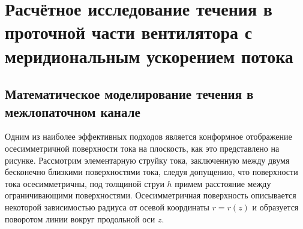 \chapter{Расчётное исследование течения в проточной части вентилятора с меридиональным ускорением потока}

\section{Математическое моделирование течения в межлопаточном канале }

Одним из наиболее эффективных подходов является конформное отображение осесимметричной поверхности тока на плоскость, как это представлено на рисунке.
Рассмотрим элементарную струйку тока, заключенную между двумя бесконечно близкими поверхностями тока, следуя допущению, что поверхности тока осесимметричны, под толщиной струи \(h\) примем расстояние между ограничивающими поверхностями. Осесимметричная поверхность описывается некоторой зависимостью радиуса от осевой координаты \(r=r(z)\) и образуется поворотом линии вокруг продольной оси \(z\).

\FloatBarrier
